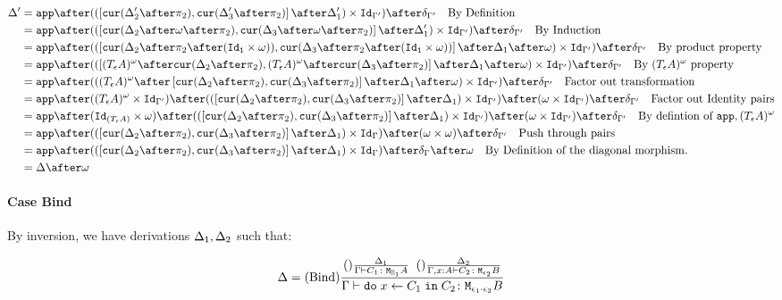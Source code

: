 {    \begin{align}
        \D' & =\app\after((\fld{\cur{\D_2'\after\pp}}{\cur{\D_3'\after\pp}}\after\D_1')\times \Id{\G'})\after\diag{\G'}\qt{By Definition}\\
        & =\app\after((\fld{\cur{\D_2\after\w\after\pp}}{\cur{\D_3\after\w\after\pp}}\after\D_1')\times \Id{\G'})\after\diag{\G'}\qt{By Induction}\\
        & = \app\after((\fld{\cur{\D_2\after\pp\after(\Id{\1}\times \w)}}{\cur{\D_3\after\pp\after(\Id{\1}\times \w)}}\after\D_1\after\w)\times \Id{\G'})\after\diag{\G'}\qt{By product property}\\
        & = \app\after((\fld{(\tea)^{\w}\after\cur{\D_2\after\pp}}{(\tea)^{\w}\after\cur{\D_3\after\pp}}\after\D_1\after\w)\times \Id{\G'})\after\diag{\G'}\qt{By $(\tea)^{\w}$ property}\\
        & = \app\after(((\tea)^{\w}\after\fld{\cur{\D_2\after\pp}}{\cur{\D_3\after\pp}}\after\D_1\after\w)\times \Id{\G'})\after\diag{\G'}\qt{Factor out transformation}\\
        & = \app\after((\tea)^{\w}\times\Id{\G'})\after((\fld{\cur{\D_2\after\pp}}{\cur{\D_3\after\pp}}\after\D_1)\times \Id{\G'})\after(\w \times \Id{\G'})\after\diag{\G'}\qt{Factor out Identity pairs}\\
        & = \app\after(\Id{(\tea)}\times\w)\after((\fld{\cur{\D_2\after\pp}}{\cur{\D_3\after\pp}}\after\D_1) \times \Id{\G'})\after(\w \times \Id{\G'})\after\diag{\G'}\qt{By defintion of $\app, (\tea)^{\w}$}\\
        & = \app\after((\fld{\cur{\D_2\after\pp}}{\cur{\D_3\after\pp}}\after\D_1)\times \idg)\after(\w \times \w)\after\diag{\G'}\qt{Push through pairs}\\
        & = \app\after((\fld{\cur{\D_2\after\pp}}{\cur{\D_3\after\pp}}\after\D_1)\times \idg)\after\diag{\G}\after\w\qt{By Definition of the diagonal morphism.}\\
        & = \D\after\w
    \end{align}


    \paragraph{Case Bind}
    By inversion, we have derivations $\Delta_1, \Delta_2$ such that:


    \begin{equation}
        \Delta = (\text{Bind}) \frac{
            (\text{}) \frac{\Delta_1}{\Gamma \vdash C_1 \colon \texttt{M}_{\mathbb{E}_1}{A}}
            \;\;
            (\text{}) \frac{\Delta_2}{\Gamma,x: A \vdash C_2 \colon \texttt{M}_{\epsilon_2}{B}}
        }{
            \Gamma \vdash \texttt{do}\; x \leftarrow C_1 \;\texttt{in}\; C_2 \colon \texttt{M}_{\epsilon_1\cdot\epsilon_2}{B}
        }
    \end{equation}

}
